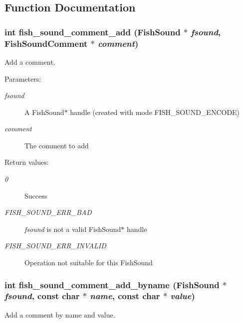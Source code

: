 \subsection{Function Documentation}
\subsubsection{\setlength{\rightskip}{0pt plus 5cm}int fish\_\-sound\_\-comment\_\-add ({\bf Fish\-Sound} $\ast$ {\em fsound}, {\bf Fish\-Sound\-Comment} $\ast$ {\em comment})}\label{comments_8h_a5}


Add a comment. 

\begin{Desc}
\item[Parameters:]
\begin{description}
\item[{\em fsound}]A Fish\-Sound$\ast$ handle (created with mode FISH\_\-SOUND\_\-ENCODE) \item[{\em comment}]The comment to add \end{description}
\end{Desc}
\begin{Desc}
\item[Return values:]
\begin{description}
\item[{\em 0}]Success \item[{\em FISH\_\-SOUND\_\-ERR\_\-BAD}]{\em fsound\/} is not a valid Fish\-Sound$\ast$ handle \item[{\em FISH\_\-SOUND\_\-ERR\_\-INVALID}]Operation not suitable for this Fish\-Sound \end{description}
\end{Desc}
\subsubsection{\setlength{\rightskip}{0pt plus 5cm}int fish\_\-sound\_\-comment\_\-add\_\-byname ({\bf Fish\-Sound} $\ast$ {\em fsound}, const char $\ast$ {\em name}, const char $\ast$ {\em value})}\label{comments_8h_a6}


Add a comment by name and value. 

